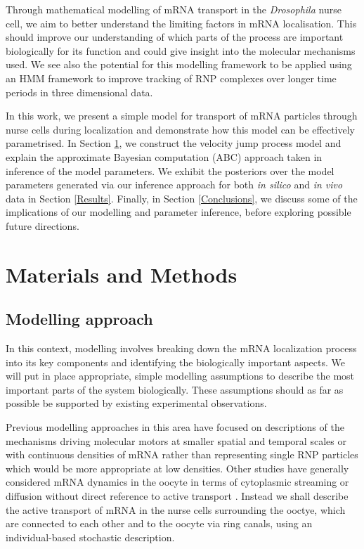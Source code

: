 \documentclass[twocolumn]{biophys}
\begin{document}
Through mathematical modelling of mRNA transport in the \textit{Drosophila} nurse cell, we aim to better understand the limiting factors in mRNA localisation. This should improve our understanding of which parts of the process are important biologically for its function and could give insight into the molecular mechanisms used.
We see also the potential for this modelling framework to be applied using an HMM framework to improve tracking of RNP complexes over longer time periods in three dimensional data.

In this work, we present a simple model for transport of mRNA particles through nurse cells during localization and demonstrate how this model can be effectively parametrised.
In Section \ref{Methods}, we construct the velocity jump process model and explain the approximate Bayesian computation (ABC) approach taken in inference of the model parameters.
We exhibit the posteriors over the model parameters generated via our inference approach for both \textit{in silico} and \textit{in vivo} data in Section \ref{Results}.
Finally, in Section \ref{Conclusions}, we discuss some of the implications of our modelling and parameter inference, before exploring possible future directions.

\section{Materials and Methods} \label{Methods}
\subsection{Modelling approach}
In this context, modelling involves breaking down the mRNA localization process into its key components and identifying the biologically important aspects. 
We will put in place appropriate, simple modelling assumptions to describe the most important parts of the system biologically.
These assumptions should as far as possible be supported by existing experimental observations.

Previous modelling approaches in this area have focused on descriptions of the mechanisms driving molecular motors at smaller spatial and temporal scales \citep{bressloff2013stochastic} or with continuous densities of mRNA \citep{szymanska2014mathematical} rather than representing single RNP particles which would be more appropriate at low densities.
Other studies have generally considered mRNA dynamics in the oocyte in terms of cytoplasmic streaming or diffusion without direct reference to active transport \citep{ganguly2012cytoplasmic, liu2011role}.
Instead we shall describe the active transport of mRNA in the nurse cells surrounding the ooctye, which are connected to each other and to the oocyte via ring canals, using an individual-based stochastic description.
\end{document}
